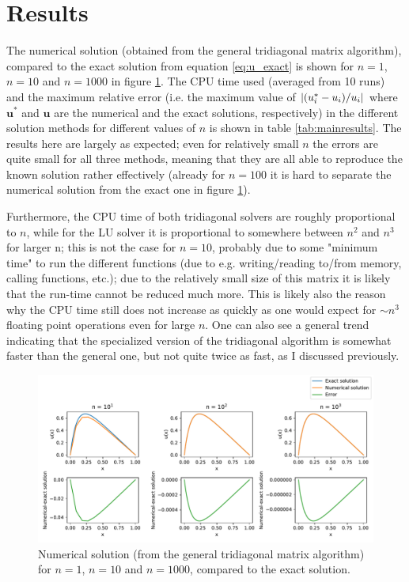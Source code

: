 \documentclass[a4paper,english]{article}
\renewcommand\vec{\mathbf}
\newcommand\norm[1]{\left\lvert#1\right\rvert}
\let\originalleft\left
\let\originalright\right
\renewcommand{\left}{\mathopen{}\mathclose\bgroup\originalleft}
\renewcommand{\right}{\aftergroup\egroup\originalright}
\begin{document}
\section{Results}
The numerical solution (obtained from the general tridiagonal matrix algorithm), compared to the exact solution from equation \ref{eq:u_exact} is shown for $n=1$, $n=10$ and $n=1000$ in figure \ref{fig:general_plot}. The CPU time used (averaged from 10 runs) and the maximum relative error (i.e. the maximum value of $\norm{\left(u^*_i-u_i\right)/u_i}$ where $\vec{u}^*$ and $\vec{u}$ are the numerical and the exact solutions, respectively) in the different solution methods for different values of $n$ is shown in table \ref{tab:mainresults}. The results here are largely as expected; even for relatively small $n$ the errors are quite small for all three methods, meaning that they are all able to reproduce the known solution rather effectively (already for $n=100$ it is hard to separate the numerical solution from the exact one in figure \ref{fig:general_plot}). \par
Furthermore, the CPU time of both tridiagonal solvers are roughly proportional to $n$, while for the LU solver it is proportional to somewhere between $n^2$ and $n^3$ for larger n; this is not the case for $n=10$, probably due to some "minimum time" to run the different functions (due to e.g. writing/reading to/from memory, calling functions, etc.); due to the relatively small size of this matrix it is likely that the run-time cannot be reduced much more. This is likely also the reason why the CPU time still does not increase as quickly as one would expect for $\sim n^3$ floating point operations even for large $n$. One can also see a general trend indicating that the specialized version of the tridiagonal algorithm is somewhat faster than the general one, but not quite twice as fast, as I discussed previously. \par
\begin{figure}[ht]
  \centering
  \includegraphics[width=0.96\linewidth]{general_plot.pdf}
  \caption{Numerical solution (from the general tridiagonal matrix algorithm) for $n=1$, $n=10$ and $n=1000$, compared to the exact solution.}
  \label{fig:general_plot}
\end{figure}
\end{document}
